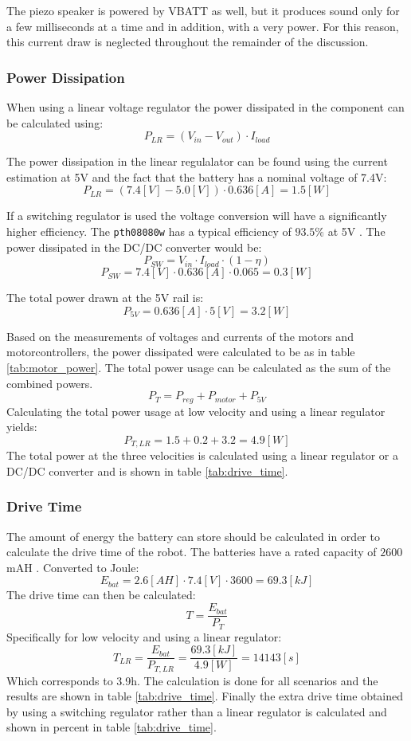 The piezo speaker is powered by VBATT as well, but it produces sound only for a few milliseconds at a time and in addition, with a very power.
For this reason, this current draw is neglected throughout the remainder of the discussion.

\subsubsection*{Power Dissipation} %
\label{sec:power_dissipation}
When using a linear voltage regulator the power dissipated in the component can be calculated using:
$$P_{LR} = (V_{in} - V_{out}) \cdot I_{load}$$

The power dissipation in the linear regulalator can be found using the current estimation at 5V and the fact that the battery has a nominal voltage of 7.4V:
$$P_{LR} = (7.4 [V] - 5.0 [V]) \cdot 0.636 [A] = 1.5 [W]$$

If a switching regulator is used the voltage conversion will have a significantly higher efficiency.
The \texttt{pth08080w} has a typical efficiency of $93.5\%$ at 5V \cite{pth08080}.
The power dissipated in the DC/DC converter would be:
$$P_{SW} = V_{in} \cdot I_{load} \cdot (1 - \eta) $$
$$P_{SW} = 7.4 [V] \cdot 0.636 [A] \cdot 0.065 = 0.3 [W]$$


The total power drawn at the 5V rail is:
$$P_{5V} = 0.636 [A] \cdot 5 [V] = 3.2 [W]$$

Based on the measurements of voltages and currents of the motors and motorcontrollers, the power dissipated were calculated to be as in table \ref{tab:motor_power}.
The total power usage can be calculated as the sum of the combined powers.
$$P_{T} = P_{reg} + P_{motor} + P_{5V}$$ 
Calculating the total power usage at low velocity and using a linear regulator yields:
$$P_{T,LR} = 1.5 + 0.2 + 3.2 = 4.9 [W]$$ 
The total power at the three velocities is calculated using a linear regulator or a DC/DC converter and is shown in table \ref{tab:drive_time}. 

\subsubsection*{Drive Time}
The amount of energy the battery can store should be calculated in order to calculate the drive time of the robot.
The batteries have a rated capacity of $2600$mAH \cite{battery}.
Converted to Joule: 
$$ E_{bat} = 2.6 [AH] \cdot 7.4 [V]  \cdot 3600 = 69.3 [kJ]$$
The drive time can then be calculated: 
$$ T = \frac{E_{bat}}{P_T} $$
Specifically for low velocity and using a linear regulator:
$$ T_{LR} = \frac{E_{bat}}{P_{T,LR}} = \frac{69.3 [kJ]}{4.9 [W]} = 14143 [s] $$
Which corresponds to 3.9h. The calculation is done for all scenarios and the results are shown in table \ref{tab:drive_time}.
Finally the extra drive time obtained by using a switching regulator rather than a linear regulator is calculated and shown in percent in table \ref{tab:drive_time}.

